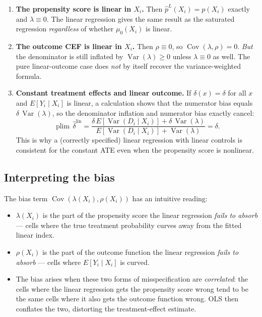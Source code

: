\documentclass[11pt]{article}
\theoremstyle{remark}
\begin{document}
\begin{enumerate}
  \item \textbf{The propensity score is linear in $X_i$.}  Then
        $\hat p^L(X_i) = p(X_i)$ exactly and $\lambda \equiv 0$.
        The linear regression gives the same result as the saturated regression
        \emph{regardless} of whether $\mu_0(X_i)$ is linear.

  \item \textbf{The outcome CEF is linear in $X_i$.}  Then $\rho \equiv 0$, so
        $\operatorname{Cov}(\lambda,\rho)=0$.  \emph{But} the denominator is still
        inflated by $\operatorname{Var}(\lambda)\geq 0$ unless $\lambda\equiv 0$ as well.
        The pure linear-outcome case does \emph{not} by itself recover the
        variance-weighted formula.

  \item \textbf{Constant treatment effects and linear outcome.}  If
        $\delta(x)=\delta$ for all $x$ and $E[Y_i\mid X_i]$ is linear, a
        calculation shows that the numerator bias equals
        $\delta\,\operatorname{Var}(\lambda)$, so the denominator inflation and
        numerator bias exactly cancel:
        \[
          \operatorname{plim}\,\hat\delta^{\mathrm{lin}}
          = \frac{\delta\,E[\operatorname{Var}(D_i\mid X_i)] + \delta\,\operatorname{Var}(\lambda)}
                 {E[\operatorname{Var}(D_i\mid X_i)] + \operatorname{Var}(\lambda)}
          = \delta.
        \]
        This is why a (correctly specified) linear regression with linear controls is
        consistent for the constant ATE even when the propensity score is nonlinear.
\end{enumerate}

\subsection{Interpreting the bias}

The bias term $\operatorname{Cov}(\lambda(X_i), \rho(X_i))$ has an intuitive reading:

\begin{itemize}
  \item $\lambda(X_i)$ is the part of the propensity score the linear regression
        \emph{fails to absorb} --- cells where the true treatment probability curves
        away from the fitted linear index.
  \item $\rho(X_i)$ is the part of the outcome function the linear regression
        \emph{fails to absorb} --- cells where $E[Y_i\mid X_i]$ is curved.
  \item The bias arises when these two forms of misspecification are
        \emph{correlated}: the cells where the linear regression gets the propensity
        score wrong tend to be the same cells where it also gets the outcome function
        wrong.  OLS then conflates the two, distorting the treatment-effect estimate.
\end{itemize}
\end{document}
